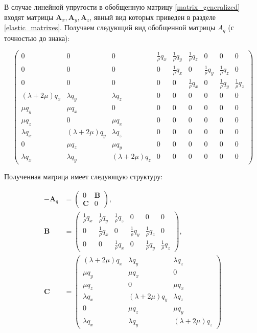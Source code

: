 В случае линейной упругости в обобщенную матрицу \ref{matrix_generalized} входят матрицы $\mathbf{A}_x, \mathbf{A}_y, \mathbf{A}_z$, явный вид которых приведен в разделе \ref{elastic_matrixes}. Получаем следующий вид обобщенной матрицы $A_q$ (с точностью до знака):

\begin{equation}
\label{matrix_generalized_elastic}
\left( \begin{array}{cccccccccccc}
0 & 0 & 0 & \frac 1 \rho q_x & \frac 1 \rho q_y & \frac 1 \rho q_z & 0 & 0 & 0 \\ 
0 & 0 & 0 & 0 & \frac 1 \rho q_x & 0 & \frac 1 \rho q_y & \frac 1 \rho q_z & 0 \\ 
0 & 0 & 0 & 0 & 0 & \frac 1 \rho q_x & 0 & \frac 1 \rho q_y & \frac 1 \rho q_z \\ 
(\lambda+2\mu) q_x & \lambda q_y & \lambda q_z & 0 & 0 & 0 & 0 & 0 & 0 \\ 
\mu q_y & \mu q_x & 0 & 0 & 0 & 0 & 0 & 0 & 0 \\ 
\mu q_z & 0 & \mu q_x & 0 & 0 & 0 & 0 & 0 & 0 \\ 
\lambda q_x & (\lambda+2\mu) q_y & \lambda q_z & 0 & 0 & 0 & 0 & 0 & 0 \\ 
0 & \mu q_z & \mu q_y & 0 & 0 & 0 & 0 & 0 & 0 \\ 
\lambda q_x & \lambda q_y & (\lambda+2\mu) q_z & 0 & 0 & 0 & 0 & 0 & 0  
\end{array} \right)
\end{equation}

Полученная матрица имеет следующую структуру:

\begin{align}
- \mathbf{A}_q &=
\left( \begin{array}{cccccccccccc}
0 & \mathbf{B} \\
\mathbf{C} & 0
\end{array} \right),
\nonumber\\
\mathbf{B} &= 
\left( \begin{array}{cccccccccccc}
\frac 1 \rho q_x & \frac 1 \rho q_y & \frac 1 \rho q_z & 0 & 0 & 0 \\ 
0 & \frac 1 \rho q_x & 0 & \frac 1 \rho q_y & \frac 1 \rho q_z & 0 \\ 
0 & 0 & \frac 1 \rho q_x & 0 & \frac 1 \rho q_y & \frac 1 \rho q_z 
\end{array} \right),
\nonumber\\
\mathbf{C} &= 
\left( \begin{array}{cccccccccccc}
(\lambda+2\mu) q_x & \lambda q_y & \lambda q_z \\ 
\mu q_y & \mu q_x & 0 \\ 
\mu q_z & 0 & \mu q_x \\ 
\lambda q_x & (\lambda+2\mu) q_y & \lambda q_z \\ 
0 & \mu q_z & \mu q_y \\ 
\lambda q_x & \lambda q_y & (\lambda+2\mu) q_z  
\end{array} \right)
\end{align}

